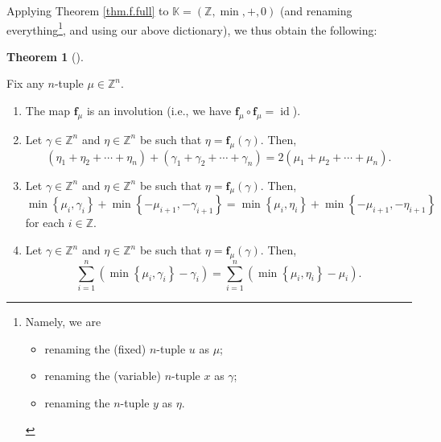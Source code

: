 \documentclass[numbers=enddot,12pt,final,onecolumn,notitlepage]{scrartcl}%
\theoremstyle{definition}
\newtheorem{theo}{Theorem}[section]
\newenvironment{theorem}[1][]
{\begin{theo}[#1]\begin{leftbar}}
{\end{leftbar}\end{theo}}
\let\sumnonlimits\sum
\renewcommand{\sum}{\sumnonlimits\limits}
\begin{document}
Applying Theorem \ref{thm.f.full} to $\mathbb{K}=\left(  \mathbb{Z}%
,\min,+,0\right)  $ (and renaming everything\footnote{Namely, we are
\par
\begin{itemize}
\item renaming the (fixed) $n$-tuple $u$ as $\mu$;
\par
\item renaming the (variable) $n$-tuple $x$ as $\gamma$;
\par
\item renaming the $n$-tuple $y$ as $\eta$.
\end{itemize}
\par
{}}, and using our above dictionary), we thus obtain the following:

\begin{theorem}
\label{thm.fZ.full}Fix any $n$-tuple $\mu\in\mathbb{Z}^{n}$.

\begin{enumerate}
\item[\textbf{(a)}] The map $\mathbf{f}_{\mu}$ is an involution (i.e., we have
$\mathbf{f}_{\mu}\circ\mathbf{f}_{\mu}=\operatorname*{id}$).

\item[\textbf{(b)}] Let $\gamma\in\mathbb{Z}^{n}$ and $\eta\in\mathbb{Z}^{n}$
be such that $\eta=\mathbf{f}_{\mu}\left(  \gamma\right)  $. Then,%
\[
\left(  \eta_{1}+\eta_{2}+\cdots+\eta_{n}\right)  +\left(  \gamma_{1}%
+\gamma_{2}+\cdots+\gamma_{n}\right)  =2\left(  \mu_{1}+\mu_{2}+\cdots+\mu
_{n}\right)  .
\]


\item[\textbf{(c)}] Let $\gamma\in\mathbb{Z}^{n}$ and $\eta\in\mathbb{Z}^{n}$
be such that $\eta=\mathbf{f}_{\mu}\left(  \gamma\right)  $. Then,%
\[
\min\left\{  \mu_{i},\gamma_{i}\right\}  +\min\left\{  -\mu_{i+1}%
,-\gamma_{i+1}\right\}  =\min\left\{  \mu_{i},\eta_{i}\right\}  +\min\left\{
-\mu_{i+1},-\eta_{i+1}\right\}
\]
for each $i\in\mathbb{Z}$.

\item[\textbf{(d)}] Let $\gamma\in\mathbb{Z}^{n}$ and $\eta\in\mathbb{Z}^{n}$
be such that $\eta=\mathbf{f}_{\mu}\left(  \gamma\right)  $. Then,%
\[
\sum_{i=1}^{n}\left(  \min\left\{  \mu_{i},\gamma_{i}\right\}  -\gamma
_{i}\right)  =\sum_{i=1}^{n}\left(  \min\left\{  \mu_{i},\eta_{i}\right\}
-\mu_{i}\right)  .
\]

\end{enumerate}
\end{theorem}
\end{document}
